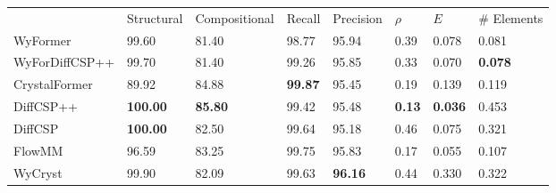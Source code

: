 \begin{tabular}{llllllll}
{} & {Structural} & {Compositional} & {Recall} & {Precision} & {$\rho$} & {$E$} & {# Elements} \\
WyFormer & 99.60 & 81.40 & 98.77 & 95.94 & 0.39 & 0.078 & 0.081 \\
WyForDiffCSP++ & 99.70 & 81.40 & 99.26 & 95.85 & 0.33 & 0.070 & \bfseries 0.078 \\
CrystalFormer & 89.92 & 84.88 & \bfseries 99.87 & 95.45 & 0.19 & 0.139 & 0.119 \\
DiffCSP++ & \bfseries 100.00 & \bfseries 85.80 & 99.42 & 95.48 & \bfseries 0.13 & \bfseries 0.036 & 0.453 \\
DiffCSP & \bfseries 100.00 & 82.50 & 99.64 & 95.18 & 0.46 & 0.075 & 0.321 \\
FlowMM & 96.59 & 83.25 & 99.75 & 95.83 & 0.17 & 0.055 & 0.107 \\
WyCryst & 99.90 & 82.09 & 99.63 & \bfseries 96.16 & 0.44 & 0.330 & 0.322 \\
\end{tabular}
